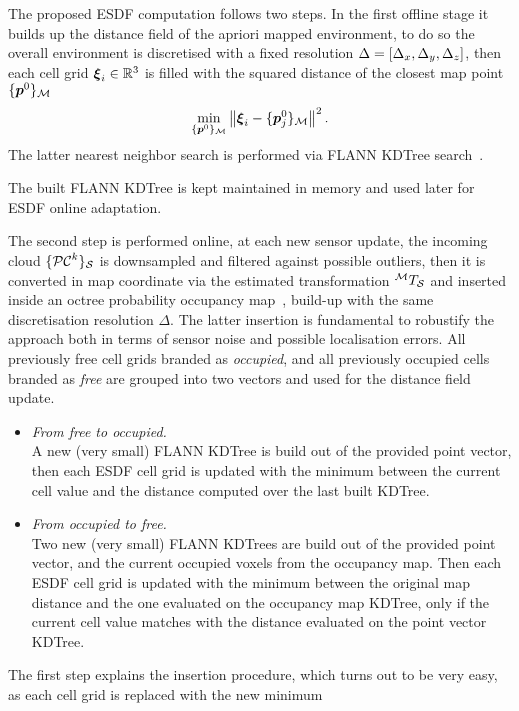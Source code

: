 The proposed ESDF computation follows two steps.
In the first offline stage it builds up the distance field of the apriori mapped environment, to do so the overall environment is
discretised with a fixed resolution $\Delta = \left[ \Delta_x, \Delta_y, \Delta_z \right]$, then each cell grid $\boldsymbol{\xi}_i \in \mathbb{R}^3$
is filled with the squared distance of the closest map point $\{\boldsymbol{p}^0 \}_{\mathcal{M}}$
\begin{equation*}
    \min_{\{\boldsymbol{p}^0 \}_{\mathcal{M}}} \left \lVert {\boldsymbol{\xi}_i - \{\boldsymbol{p}^0_j \}_{\mathcal{M}}} \right \rVert^2.
\end{equation*}
The latter nearest neighbor search is performed via FLANN KDTree search~\cite{muja2009flann}.
\begin{remark}
    The built FLANN KDTree is kept maintained in memory and used later for ESDF online adaptation.
\end{remark}
The second step is performed online, at each new sensor update, the incoming cloud $\{\mathcal{PC}^k\}_{\mathcal{S}}$ is downsampled and
filtered against possible outliers, then it is converted in map coordinate via the estimated transformation $^{\mathcal{M}}T_{\mathcal{S}}$
and inserted inside an octree probability occupancy map~\cite{hornung2013octomap}, build-up with the same discretisation resolution $\Delta$.
The latter insertion is fundamental to robustify the approach both in terms of sensor noise and possible localisation errors.
All previously free cell grids branded as \emph{occupied}, and all previously occupied cells branded as \emph{free} are grouped into
two vectors and used for the distance field update.
\begin{itemize}
    \item[] \emph{From free to occupied.} \\
    A new (very small) FLANN KDTree is build out of the provided point vector, then each ESDF cell grid is updated with the minimum
    between the current cell value and the distance computed over the last built KDTree.
    \item[] \emph{From occupied to free.} \\
    Two new (very small) FLANN KDTrees are build out of the provided point vector, and the current occupied voxels from the occupancy map.
    Then each ESDF cell grid is updated with the minimum between the original map distance and the one evaluated on the occupancy map KDTree,
    only if the current cell value matches with the distance evaluated on the point vector KDTree. 
\end{itemize}
The first step explains the insertion procedure, which turns out to be very easy, as each cell grid is replaced with the new minimum 
